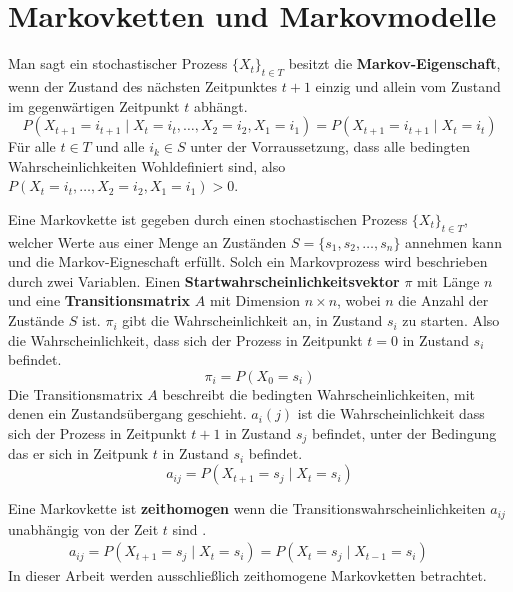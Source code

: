 \section{Markovketten und Markovmodelle}

\begin{definition}

    Man sagt ein stochastischer Prozess $\{X_t\}_{t \in T}$ besitzt die \textbf{Markov-Eigenschaft}, wenn der Zustand des nächsten Zeitpunktes $t +1$ einzig und allein vom Zustand im gegenwärtigen Zeitpunkt $t$ abhängt.
    \begin{equation}
        P(X_{t+1}=i_{t+1} \mid X_{t} = i_{t}, \dots, X_2=i_2, X_1=i_1) = P(X_{t+1}=i_{t+1} \mid X_{t} = i_{t})
    \end{equation}
    Für alle $t \in T$ und alle $i_k \in S$ unter der Vorraussetzung, dass alle bedingten Wahrscheinlichkeiten Wohldefiniert sind, also $P(X_{t} = i_{t}, \dots, X_2=i_2, X_1=i_1) > 0$.
\end{definition}

\begin{definition}[Markovkette]

    Eine Markovkette ist gegeben durch einen stochastischen Prozess $\{X_t\}_{t \in T}$, welcher Werte aus einer Menge an Zuständen $S = \{s_1, s_2, \dots, s_n\}$ annehmen kann und die Markov-Eigneschaft erfüllt. Solch ein Markovprozess wird beschrieben durch zwei Variablen. Einen \textbf{Startwahrscheinlichkeitsvektor} $\pi$ mit Länge $n$ und eine \textbf{Transitionsmatrix} $A$ mit Dimension $n \times n$, wobei $n$ die Anzahl der Zustände $S$ ist. $\pi_i$ gibt die Wahrscheinlichkeit an, in Zustand $s_i$ zu starten. Also die Wahrscheinlichkeit, dass sich der Prozess in Zeitpunkt $t=0$ in Zustand $s_i$ befindet.
    \begin{equation}
        \pi_i = P(X_0 = s_i)
    \end{equation}
    Die Transitionsmatrix $A$ beschreibt die bedingten Wahrscheinlichkeiten, mit denen ein Zustandsübergang geschieht. $a_i(j)$ ist die Wahrscheinlichkeit dass sich der Prozess in Zeitpunkt $t+1$ in Zustand $s_j$ befindet, unter der Bedingung das er sich in Zeitpunk $t$ in Zustand $s_i$ befindet.
    \begin{equation}
        a_{ij} = P(X_{t+1} = s_j \mid X_t = s_i)
    \end{equation}
\end{definition}

Eine Markovkette ist \textbf{zeithomogen} wenn die Transitionswahrscheinlichkeiten $a_{ij}$ unabhängig von der Zeit $t$ sind \cite{HmmIntroduction}.
\begin{align}
    a_{ij} = P(X_{t+1} = s_j \mid X_t = s_i) = P(X_{t} = s_j \mid X_{t-1} = s_i) && 
\end{align}
In dieser Arbeit werden ausschließlich zeithomogene Markovketten betrachtet.

